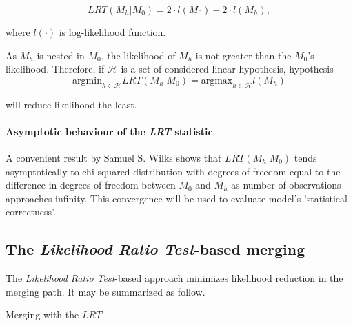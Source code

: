 $$ 
LRT(M_h|M_0) = 2 \cdot l (M_0) - 2 \cdot l (M_h), 
$$

where $l(\cdot)$ is log-likelihood function.

As $M_h$ is nested in $M_0$, the likelihood of $M_h$ is not greater than the $M_0$'s likelihood. Therefore, if $\mathcal{H}$ is a set of considered linear hypothesis, hypothesis 
$$
\mathrm{argmin}_{h \in \mathcal{H}} LRT(M_h|M_0) = \mathrm{argmax}_{h \in \mathcal{H}} l(M_h)
$$

will reduce likelihood the least.

\paragraph{Asymptotic behaviour of the \emph{LRT} statistic} 

A convenient result by Samuel S. Wilks \citep{wilks1938large} shows that $LRT(M_h|M_0)$ tends asymptotically to chi-squared distribution with degrees of freedom equal to the difference in degrees of freedom between $M_0$ and $M_h$ as number of observations approaches infinity. This convergence will be used to evaluate model's 'statistical correctness'.




\subsection{The \emph{Likelihood Ratio Test}-based merging}

The \emph{Likelihood Ratio Test}-based approach minimizes likelihood reduction in the merging path. It may be summarized as follow.


\begin{algorithm}[H]
\caption{Merging with the $LRT$}
\begin{algorithmic}[2]

    
\EndWhile
    \EndFunction
\end{algorithmic}
\end{algorithm}

